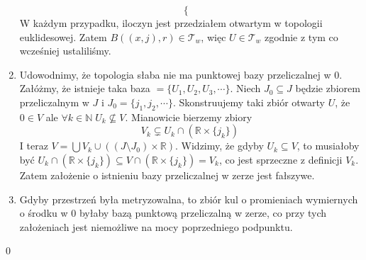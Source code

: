\documentclass{article}
\theoremstyle{definition}%
\theoremstyle{theorem}
\renewenvironment{proof}{{\bfseries Rozwiązanie \\}}{\qed}
\newcommand{\R}{\mathbb{R}} %
\newcommand{\sT}{\mathcal{T}} %
\begin{document}
\begin{proof}
\begin{enumerate}
\[\begin{cases}
		 		\end{cases}
		 		\]
			 	W każdym przypadku, iloczyn jest przedziałem otwartym w topologii euklidesowej. Zatem $B((x,j),r) \in \sT_w$, więc $U\in \sT_w$ zgodnie z tym co wcześniej ustaliliśmy.
			 	\item 
		 		Udowodnimy, że topologia słaba nie ma punktowej bazy przeliczalnej w 0. \\
		 		Załóżmy, że istnieje taka baza $= \{U_1,U_2,U_3,\cdots\}$. Niech $J_0 \subseteq J$ będzie zbiorem przeliczalnym w $J$ i $J_0=\{j_1,j_2,\cdots\}$. Skonstruujemy taki zbiór otwarty $U$, że $0\in V$ ale $\forall k\in \mathbb{N} \; U_k \not\subseteq V$.
		 		Mianowicie bierzemy zbiory
		 		\[
		 		V_k \subsetneq U_k \cap \left(\R \times \{j_k\}\right)
		 		\]
		 		I teraz $V=\bigcup V_k \cup \left((J\setminus J_0)\times \R\right)$. Widzimy, że gdyby $U_k \subseteq V$, to musiałoby być $U_k\cap (\R \times \{j_k\}) \subseteq V \cap (\R \times \{j_k\}) = V_k$, co jest sprzeczne z definicji $V_k$. Zatem założenie o istnieniu bazy przeliczalnej w zerze jest fałszywe.
		 		\item
		 		Gdyby przestrzeń była metryzowalna, to zbiór kul o promieniach wymiernych o środku w 0 byłaby bazą punktową przeliczalną w zerze, co przy tych założeniach jest niemożliwe na mocy poprzedniego podpunktu.
		 	\end{enumerate}
		 	
		 \end{proof}
\end{document}
